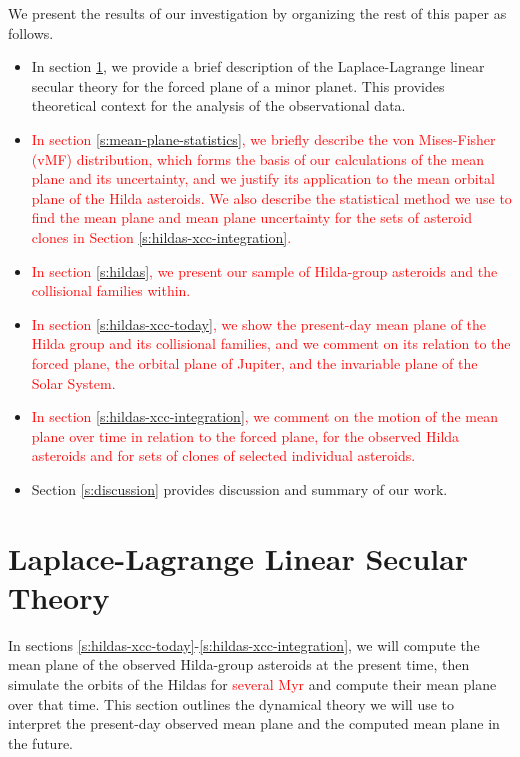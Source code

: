 \documentclass[a4paper,fleqn]{cas-sc}
\begin{document}
\begin{linenumbers}
We present the results of our investigation by organizing the rest of this paper as follows.
\begin{itemize}
\item In section \ref{s:laplace-theory}, we provide a brief description of the Laplace-Lagrange linear secular theory for the forced plane of a minor planet.
This provides theoretical context for the analysis of the observational data.
\item \textcolor{red}{In section \ref{s:mean-plane-statistics}, we briefly describe the von Mises-Fisher (vMF) distribution, which forms the basis of our calculations of the mean plane and its uncertainty, and we justify its application to the mean orbit\textcolor{red}{al} plane of the Hilda asteroids.
We also describe the statistical method we use to find the mean plane and mean plane uncertainty for the sets of asteroid clones in Section \ref{s:hildas-xcc-integration}.
}
\item \textcolor{red}{In section \ref{s:hildas}, we present our sample of Hilda-group asteroids and the collisional families within.}
\item \textcolor{red}{In section \ref{s:hildas-xcc-today}, we show the present-day mean plane of the Hilda group and its collisional families, and we comment on its relation to the forced plane, the orbital plane of Jupiter, and the invariable plane of the Solar System.}
\item \textcolor{red}{In section \ref{s:hildas-xcc-integration}, we comment on the motion of the mean plane over time in relation to the forced plane, for the observed Hilda asteroids and for sets of clones of selected individual asteroids.}
\item Section \ref{s:discussion} provides discussion and summary of our work.
\end{itemize}



\section{Laplace-Lagrange Linear Secular Theory}
\label{s:laplace-theory}
In sections \ref{s:hildas-xcc-today}-\ref{s:hildas-xcc-integration}, we will compute the mean plane of the observed Hilda-group asteroids at the present time, then simulate the orbits of the Hildas for \textcolor{red}{several Myr} and compute their mean plane over that time.
This section outlines the dynamical theory we will use to interpret the present-day observed mean plane and the computed mean plane in the future.


\end{linenumbers}
\end{document}
